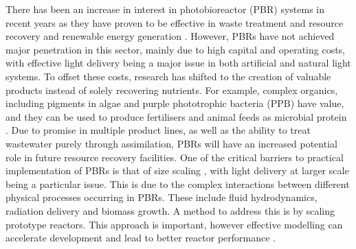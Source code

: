 There has been an increase in interest in photobioreactor (PBR) systems in recent years as they have proven to be effective in waste treatment and resource recovery \cite{hulsen2016a, hulsen2016} and renewable energy generation \cite{adessi2014}. However, PBRs have not achieved major penetration in this sector, mainly due to high capital and operating costs, with effective light delivery being a major issue in both artificial and natural light systems. To offset these costs, research has shifted to the creation of valuable products instead of solely recovering nutrients. For example, complex organics, including pigments in algae \cite{borowitzka2013} and purple phototrophic bacteria (PPB) have value, and they can be used to produce fertilisers and animal feeds as microbial protein \cite{matassa2016, matassa2015}. Due to promise in multiple product lines, as well as the ability to treat wastewater purely through assimilation, PBRs will have an increased potential role in future resource recovery facilities.
\skippingparagraph
One of the critical barriers to practical implementation of PBRs is that of size scaling \cite{acienFernandez1999}, with light delivery at larger scale being a particular issue. This is due to the complex interactions between different physical processes occurring in PBRs. These include fluid hydrodynamics, radiation delivery and biomass growth. A method to address this is by scaling prototype reactors. This approach is important, however effective modelling can accelerate development and lead to better reactor performance \cite{perez-Castro2016}. 
\skippingparagraph
